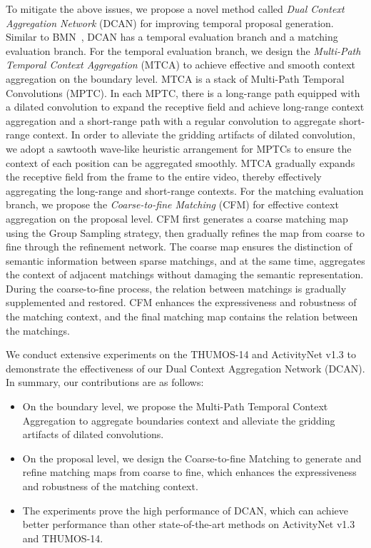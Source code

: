 \documentclass[letterpaper]{article} \usepackage{aaai22}  \usepackage{times}  \usepackage{helvet}  \usepackage{courier}  \usepackage[hyphens]{url}  \usepackage{graphicx} \urlstyle{rm} \def\UrlFont{\rm}  \usepackage{natbib}  \usepackage{caption} \DeclareCaptionStyle{ruled}{labelfont=normalfont,labelsep=colon,strut=off} \frenchspacing  \setlength{\pdfpagewidth}{8.5in}  \setlength{\pdfpageheight}{11in}  \usepackage{algorithm}
\begin{document}
To mitigate the above issues, we propose a novel method called {\em Dual Context Aggregation Network} (DCAN) for improving temporal proposal generation. 
Similar to BMN~\cite{bmn}, DCAN has a temporal evaluation branch and a matching evaluation branch. 
For the temporal evaluation branch, we design the {\em Multi-Path Temporal Context Aggregation} (MTCA) to achieve effective and smooth context aggregation on the boundary level. 
MTCA is a stack of Multi-Path Temporal Convolutions (MPTC).
In each MPTC, there is a long-range path equipped with a dilated convolution to expand the receptive field and achieve long-range context aggregation and a short-range path with a regular convolution to aggregate short-range context.
In order to alleviate the gridding artifacts of dilated convolution, we adopt a sawtooth wave-like heuristic arrangement for MPTCs to ensure the context of each position can be aggregated smoothly.
MTCA gradually expands the receptive field from the frame to the entire video, thereby effectively aggregating the long-range and short-range contexts.
For the matching evaluation branch, we propose the {\em Coarse-to-fine Matching} (CFM) for effective context aggregation on the proposal level.
CFM first generates a coarse matching map using the Group Sampling strategy, then gradually refines the map from coarse to fine through the refinement network.
The coarse map ensures the distinction of semantic information between sparse matchings, and at the same time, aggregates the context of adjacent matchings without damaging the semantic representation.
During the coarse-to-fine process, the relation between matchings is gradually supplemented and restored.
CFM enhances the expressiveness and robustness of the matching context, and the final matching map contains the relation between the matchings.



We conduct extensive experiments on the THUMOS-14 and ActivityNet v1.3 to demonstrate the effectiveness of our Dual Context Aggregation Network (DCAN). 
In summary, our contributions are as follows:
\begin{itemize}
\item{On the boundary level, we propose the Multi-Path Temporal Context Aggregation to aggregate boundaries context and alleviate the gridding artifacts of dilated convolutions.}
\item{On the proposal level, we design the Coarse-to-fine Matching to generate and refine matching maps from coarse to fine, which enhances the expressiveness and robustness of the matching context.}
\item{The experiments prove the high performance of DCAN, which can achieve better performance than other state-of-the-art methods on ActivityNet v1.3 and THUMOS-14.}

\end{itemize}
\end{document}
